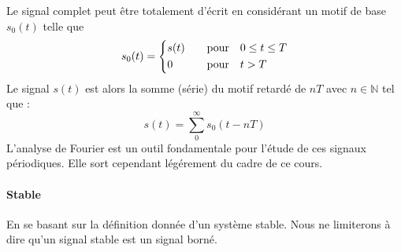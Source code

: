 Le signal complet peut être totalement d'écrit en considérant un motif de base $s_0(t)$ telle que
\begin{align*}
s_0(t) =
\begin{dcases}
    s(t)&\quad\text{pour}\quad 0\le t\le T   \\
    0&\quad\text{pour}\quad t>T
\end{dcases}
\end{align*}
Le signal $s(t)$ est alors la somme (série) du motif retardé de $nT$ 
avec $n\in\mathbb{N}$ tel que :
$$
s(t)=\sum_0^\infty s_0(t-nT)
$$
L'analyse de Fourier est un outil fondamentale pour l'étude 
de ces signaux périodiques. Elle sort cependant légérement du cadre de ce cours.

\paragraph{Stable}
En se basant sur la définition donnée d'un système stable.
Nous ne limiterons à dire qu'un signal stable est un signal 
borné.

